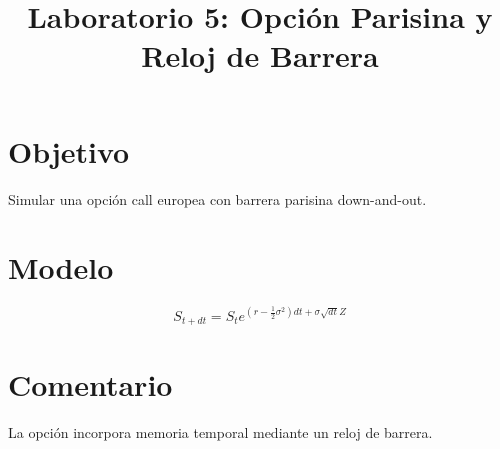 \documentclass[12pt]{article}
\begin{document}
\title{Laboratorio 5: Opción Parisina y Reloj de Barrera}
\maketitle
\section{Objetivo}
Simular una opción call europea con barrera parisina down-and-out.
\section{Modelo}
\[ S_{t+dt}=S_t e^{(r-\frac12\sigma^2)dt+\sigma\sqrt{dt}Z} \]
\section{Comentario}
La opción incorpora memoria temporal mediante un reloj de barrera.
\end{document}
